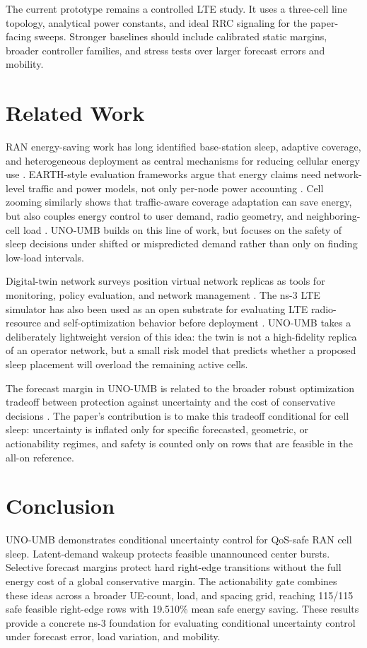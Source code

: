 \documentclass[10pt,twocolumn]{article}
\begin{document}
The current prototype remains a controlled LTE study.  It uses a three-cell
line topology, analytical power constants, and ideal RRC signaling for the
paper-facing sweeps.  Stronger baselines should include calibrated static
margins, broader controller families, and stress tests over larger forecast
errors and mobility.

\section{Related Work}

RAN energy-saving work has long identified base-station sleep, adaptive
coverage, and heterogeneous deployment as central mechanisms for reducing
cellular energy use \cite{hasan2011green}.  EARTH-style evaluation frameworks
argue that energy claims need network-level traffic and power models, not only
per-node power accounting \cite{auer2011energy}.  Cell zooming similarly shows
that traffic-aware coverage adaptation can save energy, but also couples energy
control to user demand, radio geometry, and neighboring-cell load
\cite{niu2010cellzooming}.  UNO-UMB builds on this line of work, but focuses on
the safety of sleep decisions under shifted or mispredicted demand rather than
only on finding low-load intervals.

Digital-twin network surveys position virtual network replicas as tools for
monitoring, policy evaluation, and network management \cite{wu2021digitaltwin}.
The ns-3 LTE simulator has also been used as an open substrate for evaluating
LTE radio-resource and self-optimization behavior before deployment
\cite{baldo2011lte}.  UNO-UMB takes a deliberately lightweight version of this
idea: the twin is not a high-fidelity replica of an operator network, but a
small risk model that predicts whether a proposed sleep placement will overload
the remaining active cells.

The forecast margin in UNO-UMB is related to the broader robust optimization
tradeoff between protection against uncertainty and the cost of conservative
decisions \cite{bertsimas2004price}.  The paper's contribution is to make this
tradeoff conditional for cell sleep: uncertainty is inflated only for specific
forecasted, geometric, or actionability regimes, and safety is counted only on
rows that are feasible in the all-on reference.

\section{Conclusion}

UNO-UMB demonstrates conditional uncertainty control for QoS-safe RAN cell
sleep.  Latent-demand wakeup protects feasible unannounced center bursts.
Selective forecast margins protect hard right-edge transitions without the full
energy cost of a global conservative margin.  The actionability gate combines
these ideas across a broader UE-count, load, and spacing grid, reaching 115/115
safe feasible right-edge rows with 19.510\% mean safe energy saving.  These
results provide a concrete ns-3 foundation for evaluating conditional
uncertainty control under forecast error, load variation, and mobility.



\end{document}
